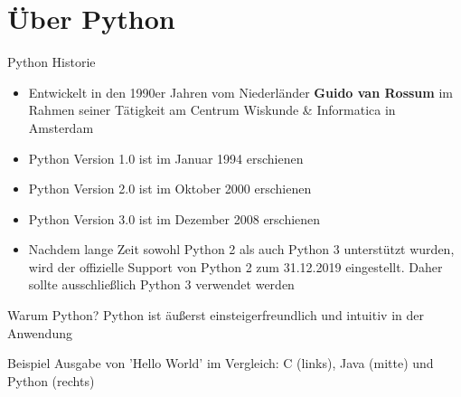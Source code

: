 \newcommand{\decktitle}{Python I - Allgemeines}

%
%


		
		
\section{Über Python}

    \begin{frame}{Python Historie}
        \begin{itemize}
            \item Entwickelt in den 1990er Jahren vom Niederländer \textbf{Guido van Rossum} im Rahmen seiner Tätigkeit am Centrum Wiskunde \& Informatica in Amsterdam
            \item Python Version 1.0 ist im Januar 1994 erschienen
            \item Python Version 2.0 ist im Oktober 2000 erschienen
            \item Python Version 3.0 ist im Dezember 2008 erschienen
            \item Nachdem lange Zeit sowohl Python 2 als auch Python 3 unterstützt wurden, wird der offizielle Support von Python 2 zum 31.12.2019 eingestellt. Daher sollte ausschließlich Python 3 verwendet werden
        \end{itemize}
    \end{frame}
    
    
    \begin{frame}{Warum Python?}
        Python ist äußerst einsteigerfreundlich und intuitiv in der Anwendung
        
        \begin{exampleblock}{Beispiel}
        Ausgabe von 'Hello World' im Vergleich: C (links), Java (mitte) und Python (rechts)
        \end{exampleblock}
        
        \begin{columns}[T]
            \begin{column}{0.3\linewidth}
                
            \end{column}
            
            \begin{column}{0.3\linewidth}
                
            \end{column}

            \begin{column}{0.3\linewidth}
                
            \end{column}            
        \end{columns}
    \end{frame}
    
